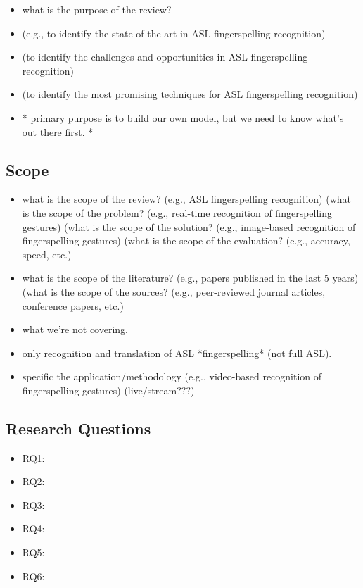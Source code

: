 \begin{itemize}
    \item what is the purpose of the review?
    \item (e.g., to identify the state of the art in ASL fingerspelling recognition)
    \item (to identify the challenges and opportunities in ASL fingerspelling recognition)
    \item (to identify the most promising techniques for ASL fingerspelling recognition)
    \item * primary purpose is to build our own model, but we need to know what's out there first. *

\end{itemize}
\subsection{Scope}
\begin{itemize}
    \item what is the scope of the review? (e.g., ASL fingerspelling recognition) (what is the scope of the problem? (e.g., real-time recognition of fingerspelling gestures) (what is the scope of the solution? (e.g., image-based recognition of fingerspelling gestures) (what is the scope of the evaluation? (e.g., accuracy, speed, etc.)
    \item what is the scope of the literature? (e.g., papers published in the last 5 years) (what is the scope of the sources? (e.g., peer-reviewed journal articles, conference papers, etc.)
    \item what we're not covering.
    \item only recognition and translation of ASL *fingerspelling* (not full ASL).
    \item specific the application/methodology (e.g., video-based recognition of fingerspelling gestures) (live/stream???)
\end{itemize}

\subsection{Research Questions}
\begin{itemize}
    \item RQ1:
    \item RQ2:
    \item RQ3:
    \item RQ4:
    \item RQ5:
    \item RQ6:
\end{itemize}

